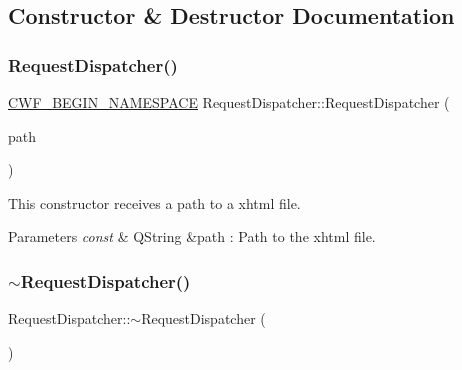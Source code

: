 \subsection{Constructor \& Destructor Documentation}
\mbox{\label{class_request_dispatcher_accb486106fd9d814d44222594a174fbb}} 
\subsubsection{\texorpdfstring{Request\+Dispatcher()}{RequestDispatcher()}}
{\footnotesize\ttfamily \hyperlink{cppwebframework__global_8h_a7492e9498cbaf9cd17dbc2215d3a0e48}{C\+W\+F\+\_\+\+B\+E\+G\+I\+N\+\_\+\+N\+A\+M\+E\+S\+P\+A\+CE} Request\+Dispatcher\+::\+Request\+Dispatcher (\begin{DoxyParamCaption}\item[{const Q\+String \&}]{path }\end{DoxyParamCaption})\hspace{0.3cm}{\ttfamily [explicit]}}



This constructor receives a path to a xhtml file. 


\begin{DoxyParams}{Parameters}
{\em const} & Q\+String \&path \+: Path to the xhtml file. \\
\hline
\end{DoxyParams}
\mbox{\label{class_request_dispatcher_a1b09805ab31a0f96d9823a2bf9de3771}} 
\subsubsection{\texorpdfstring{$\sim$\+Request\+Dispatcher()}{~RequestDispatcher()}}
{\footnotesize\ttfamily Request\+Dispatcher\+::$\sim$\+Request\+Dispatcher (\begin{DoxyParamCaption}{ }\end{DoxyParamCaption})\hspace{0.3cm}{\ttfamily [virtual]}}



